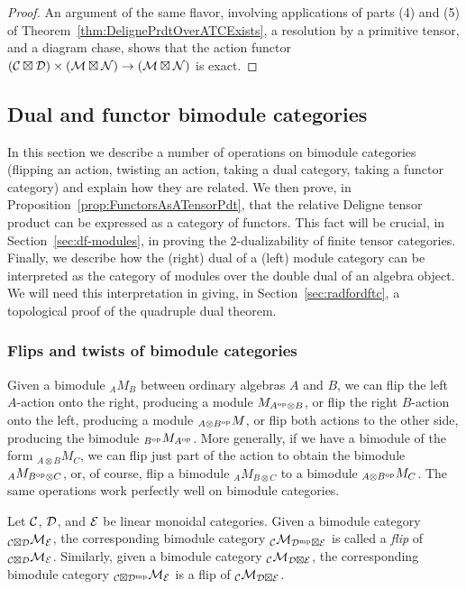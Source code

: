 \documentclass{amsart}
\begin{document}
\begin{proof}
An argument of the same flavor, involving applications of parts (4) and (5) of Theorem~\ref{thm:DelignePrdtOverATCExists}, a resolution by a primitive tensor, and a diagram chase, shows that the action functor $(\mathcal C \boxtimes \mathcal D) \times (\mathcal M \boxtimes \mathcal N) \rightarrow (\mathcal M \boxtimes \mathcal N)$ is exact.
\end{proof}


\subsection{Dual and functor bimodule categories} \label{sec:tc-bimodules}

In this section we describe a number of operations on bimodule categories (flipping an action, twisting an action, taking a dual category, taking a functor category) and explain how they are related.  We then prove, in Proposition~\ref{prop:FunctorsAsATensorPdt}, that the relative Deligne tensor product can be expressed as a category of functors.  This fact will be crucial, in Section~\ref{sec:df-modules}, in proving the $2$-dualizability of finite tensor categories.  Finally, we describe how the (right) dual of a (left) module category can be interpreted as the category of modules over the double dual of an algebra object.  We will need this interpretation in giving, in Section~\ref{sec:radfordftc}, a topological proof of the quadruple dual theorem.

\subsubsection{Flips and twists of bimodule categories} \label{sec:fliptwist}

Given a bimodule ${}_A M_B$ between ordinary algebras $A$ and $B$, we can flip the left $A$-action onto the right, producing a module $M_{A^{\mathrm{op}} \otimes B}$, or flip the right $B$-action onto the left, producing a module ${}_{A \otimes B^{\mathrm{op}}} M$, or flip both actions to the other side, producing the bimodule ${}_{B^{\mathrm{op}}} M_{A^{\mathrm{op}}}$.  More generally, if we have a bimodule of the form ${}_{A \otimes B} M_C$, we can flip just part of the action to obtain the bimodule ${}_A M_{B^{\mathrm{op}} \otimes C}$, or, of course, flip a bimodule ${}_A M_{B \otimes C}$ to a bimodule ${}_{A \otimes B^{\mathrm{op}}} M_C$.  The same operations work perfectly well on bimodule categories.

\begin{definition}
Let $\mathcal C$, $\mathcal D$, and $\mathcal E$ be linear monoidal categories.  Given a bimodule category ${}_{\mathcal C \boxtimes \mathcal D} \mathcal M_\mathcal E$, the corresponding bimodule category ${}_{\mathcal C} \mathcal M_{\mathcal D^{\mathrm{mp}} \boxtimes \mathcal E}$ is called a \emph{flip} of ${}_{\mathcal C \boxtimes \mathcal D} \mathcal M_\mathcal E$.  Similarly, given a bimodule category ${}_\mathcal C \mathcal M_{\mathcal D \boxtimes \mathcal E}$, the corresponding bimodule category ${}_{\mathcal C \boxtimes \mathcal D^{\mathrm{mp}}} \mathcal M_\mathcal E$ is a flip of ${}_\mathcal C \mathcal M_{\mathcal D \boxtimes \mathcal E}$.
\end{definition}
\end{document}
